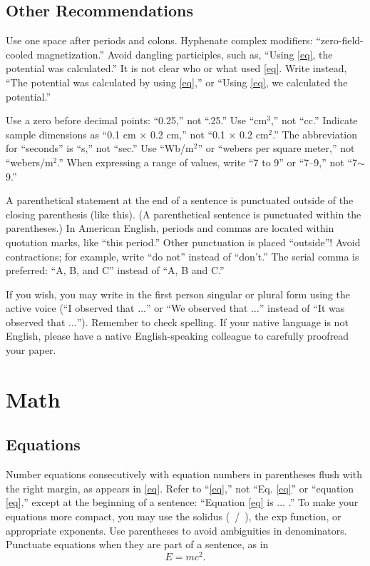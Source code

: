 \documentclass[journal,twoside,web]{ieeecolor}
\begin{document}
\subsection{Other Recommendations}
Use one space after periods and colons. Hyphenate complex modifiers:
``zero-field-cooled magnetization.'' Avoid dangling participles, such as,
``Using \eqref{eq}, the potential was calculated.'' It is not clear who or what
used \eqref{eq}. Write instead, ``The potential was calculated by using \eqref{eq},'' or
``Using \eqref{eq}, we calculated the potential.''

Use a zero before decimal points: ``0.25,'' not ``.25.'' Use
``cm$^{3}$,'' not ``cc.'' Indicate sample dimensions as ``0.1 cm
$\times $ 0.2 cm,'' not ``0.1 $\times $ 0.2 cm$^{2}$.'' The
abbreviation for ``seconds'' is ``s,'' not ``sec.'' Use
``Wb/m$^{2}$'' or ``webers per square meter,'' not
``webers/m$^{2}$.'' When expressing a range of values, write ``7 to
9'' or ``7--9,'' not ``7$\sim $9.''

A parenthetical statement at the end of a sentence is punctuated outside of
the closing parenthesis (like this). (A parenthetical sentence is punctuated
within the parentheses.) In American English, periods and commas are located within
quotation marks, like ``this period.'' Other punctuation is placed ``outside''!
Avoid contractions; for example, write ``do not'' instead of ``don't.'' The
serial comma is preferred: ``A, B, and C'' instead of ``A, B and C.''

If you wish, you may write in the first person singular or plural form using
the active voice (``I observed that $\ldots$'' or ``We observed that $\ldots$''
instead of ``It was observed that $\ldots$''). Remember to check spelling. If
your native language is not English, please have a native English-speaking
colleague to carefully proofread your paper.

\section{Math}
\subsection{Equations}
Number equations consecutively with equation numbers in parentheses flush
with the right margin, as appears in \eqref{eq}. Refer to ``\eqref{eq},'' not ``Eq. \eqref{eq}''
or ``equation \eqref{eq},'' except at the beginning of a sentence: ``Equation \eqref{eq}
is $\ldots$ .'' To make your equations more
compact, you may use the solidus (~/~), the exp function, or appropriate
exponents. Use parentheses to avoid ambiguities in denominators. Punctuate
equations when they are part of a sentence, as in
\begin{equation}E=mc^2.\label{eq}\end{equation}
\end{document}
